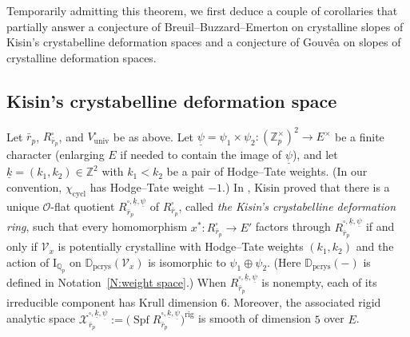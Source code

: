 \documentclass[12pt]{amsart}
\theoremstyle{definition}
\numberwithin{equation}{subsection}
\def\calO{\mathcal{O}}
\def\calV{\mathcal{V}}
\def\calX{\mathcal{X}}
\def\DD{\mathbb{D}}
\def\QQ{\mathbb{Q}}
\def\ZZ{\mathbb{Z}}
\def\rmI{\mathrm{I}}
\DeclareMathOperator{\Spf}{Spf}
\newcommand{\cycl}{\mathrm{cycl}}
\newcommand{\rig}{\mathrm{rig}}
\newcommand{\univ}{\mathrm{univ}}
\begin{document}
Temporarily admitting this theorem, we first deduce a couple of corollaries that partially answer a conjecture of Breuil--Buzzard--Emerton on crystalline slopes of Kisin's crystabelline deformation spaces and a conjecture of Gouv\^ea on slopes of crystalline deformation spaces.

\subsection{Kisin's crystabelline deformation space}
\label{S:Kisin's deformation}
Let $\bar r_p$, $R_{\bar r_p}^\square$, and $V_\univ^\square$ be as above.
Let $\underline \psi= \psi_1\times  \psi_2: (\ZZ_p^\times)^2 \to E^\times$ be a finite character (enlarging $E$ if needed to contain the image of $\underline \psi$), and let $\underline k = (k_1, k_2) \in \ZZ^2$ with $k_1<k_2$ be a pair of Hodge--Tate weights. (In our convention, $\chi_\cycl$ has Hodge--Tate weight $-1$.) In \cite{kisin-deform}, Kisin proved that there is a unique $\calO$-flat quotient $R_{\bar r_p}^{\square, \underline k, \underline \psi}$ of $R^\square_{\bar r_p}$, called \emph{the Kisin's crystabelline deformation ring}, such that every homomorphism $x^*: R_{\bar r_p}^{\square} \to E'$ factors through $R_{\bar r_p}^{\square, \underline k, \underline \psi}$ if and only if  $\calV_x$ is potentially crystalline with Hodge--Tate weights $(k_1, k_2)$ and the action of $\rmI_{\QQ_p}$ on $\DD_\mathrm{pcrys}(\calV_x)$ is isomorphic to $\psi_1 \oplus \psi_2$. (Here $\DD_\mathrm{pcrys}(-)$ is defined in Notation~\ref{N:weight space}.)  When $R_{\bar r_p}^{\square, \underline k, \underline \psi}$ is nonempty, each of its irreducible component has
Krull dimension $6$.  Moreover, the associated rigid analytic space $\calX_{\bar r_p}^{\square, \underline k, \underline \psi}:=\big(\Spf R_{\bar r_p}^{\square, \underline k, \underline \psi}\big)^\rig$ is smooth of dimension $5$ over $E$.

\end{document}
